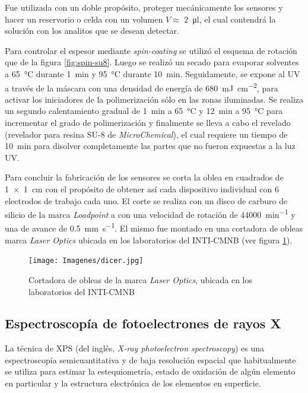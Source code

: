 		Fue utilizada con un doble propósito, proteger mecánicamente los sensores y hacer un reservorio o celda con un volumen  $V \approx$ \SI{2}{\ul}, el cual contendrá la solución con los analitos que se desean detectar.  
			
		Para controlar el espesor mediante \textit{spin-coating} se utilizó el esquema de rotación que de la figura \ref{fig:spin-su8}. Luego se realizó un secado para evaporar solventes a \SI{65}{\celsius} durante \SI{1}{\minute} y \SI{95}{\celsius} durante \SI{10}{\minute}. Seguidamente, se expone al UV a través de la máscara con una densidad de energía de \SI{680}{mJ.cm^{-2}}, para activar los iniciadores de la polimerización sólo en las zonas iluminadas. Se realiza un segundo calentamiento gradual de \SI{1}{\minute} a \SI{65}{\celsius} y \SI{12}{\minute} a \SI{95}{\celsius} para incrementar el grado de polimerización y finalmente se lleva a cabo el revelado (revelador para resina SU-8 de \textit{MicroChemical}), el cual requiere un tiempo de \SI{10}{\minute} para disolver completamente las partes que no fueron expuestas a la luz UV. 
		
		Para concluir la fabricación de los sensores se corta la oblea en cuadrados de \SI{1x1}{\cm} con el propósito de obtener así cada dispositivo individual con 6 electrodos de trabajo cada uno. El corte se realiza con un disco de carburo de silicio de la marca \textit{Loadpoint} a con una velocidad de rotación de \SI{44000}{\minute^{-1}} y una de avance de \SI{0.5}{\mm\per\second}. El mismo fue montado en una cortadora de obleas marca \textit{Laser Optics} ubicada en los laboratorios del INTI-CMNB (ver figura \ref{fig:dicer}).

			\begin{figure}[h!]
			 		  \begin{center}
			 		  \texttt{[image: Imagenes/dicer.jpg]}
			 		  \caption[Cortadora de obleas]{Cortadora de obleas de la marca \textit{Laser Optics}, ubicada en los laboratorios del INTI-CMNB}
			 		  \label{fig:dicer}
			 		  \end{center}
			 		  \end{figure}
	 	
	\subsection{Espectroscopía de fotoelectrones de rayos X}

		La técnica de XPS (del inglés, \textit {X-ray photoelectron spectroscopy}) es una espectroscopía semicuantitativa y de baja resolución espacial que habitualmente se utiliza para estimar la estequiometría, estado de oxidación de algún elemento en particular y la estructura electrónica de los elementos en superficie.\cite{siegbahn1956,siegbahn1981}

